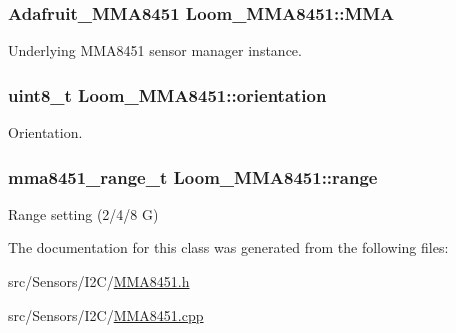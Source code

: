 \subsubsection[{\texorpdfstring{M\+MA}{MMA}}]{\setlength{\rightskip}{0pt plus 5cm}Adafruit\+\_\+\+M\+M\+A8451 Loom\+\_\+\+M\+M\+A8451\+::\+M\+MA\hspace{0.3cm}{\ttfamily [protected]}}\hypertarget{class_loom___m_m_a8451_a748213c00e6b00cac365e936a97c54d7}{}\label{class_loom___m_m_a8451_a748213c00e6b00cac365e936a97c54d7}


Underlying M\+M\+A8451 sensor manager instance. 

\subsubsection[{\texorpdfstring{orientation}{orientation}}]{\setlength{\rightskip}{0pt plus 5cm}uint8\+\_\+t Loom\+\_\+\+M\+M\+A8451\+::orientation\hspace{0.3cm}{\ttfamily [protected]}}\hypertarget{class_loom___m_m_a8451_afaa9b009ce6745e7c74ef030630e751e}{}\label{class_loom___m_m_a8451_afaa9b009ce6745e7c74ef030630e751e}


Orientation. 

\subsubsection[{\texorpdfstring{range}{range}}]{\setlength{\rightskip}{0pt plus 5cm}mma8451\+\_\+range\+\_\+t Loom\+\_\+\+M\+M\+A8451\+::range\hspace{0.3cm}{\ttfamily [protected]}}\hypertarget{class_loom___m_m_a8451_a8d48bf01b43b936b5364b13e5c64d242}{}\label{class_loom___m_m_a8451_a8d48bf01b43b936b5364b13e5c64d242}


Range setting (2/4/8 G) 



The documentation for this class was generated from the following files\+:\begin{DoxyCompactItemize}
\item 
src/\+Sensors/\+I2\+C/\hyperlink{_m_m_a8451_8h}{M\+M\+A8451.\+h}\item 
src/\+Sensors/\+I2\+C/\hyperlink{_m_m_a8451_8cpp}{M\+M\+A8451.\+cpp}\end{DoxyCompactItemize}
